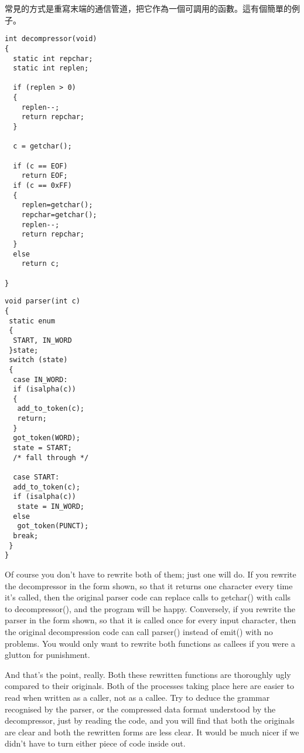 \documentclass[12pt]{article}
\begin{document}
\begin{CJK}{UTF8}{bsmi}
常見的方式是重寫末端的通信管道，把它作為一個可調用的函數。這有個簡單的例子。 

\newpage
\begin{multicols}{2}

\begin{lstlisting}[caption=decompression, basicstyle=\footnotesize]
int decompressor(void) 
{
  static int repchar;
  static int replen;

  if (replen > 0) 
  {
    replen--;
    return repchar;
  }

  c = getchar();

  if (c == EOF)
    return EOF;
  if (c == 0xFF) 
  {
    replen=getchar();
    repchar=getchar();
    replen--;
    return repchar;
  }
  else
    return c;

}
\end{lstlisting}

\begin{lstlisting}[caption=parsesr, basicstyle=\footnotesize, breaklines=true]
void parser(int c) 
{
 static enum 
 {
  START, IN_WORD
 }state;
 switch (state) 
 {
  case IN_WORD:
  if (isalpha(c)) 
  {
   add_to_token(c);
   return;
  }
  got_token(WORD);
  state = START;
  /* fall through */

  case START:
  add_to_token(c);
  if (isalpha(c))
   state = IN_WORD;
  else
   got_token(PUNCT);
  break;
 }
}
\end{lstlisting}
\end{multicols}

 Of course you don't have to rewrite both of them; just one will do. If you rewrite the decompressor in the form shown, so that it returns one character every time it's called, then the original parser code can replace calls to getchar() with calls to decompressor(), and the program will be happy. Conversely, if you rewrite the parser in the form shown, so that it is called once for every input character, then the original decompression code can call parser() instead of emit() with no problems. You would only want to rewrite both functions as callees if you were a glutton for punishment.

 And that's the point, really. Both these rewritten functions are thoroughly ugly compared to their originals. Both of the processes taking place here are easier to read when written as a caller, not as a callee. Try to deduce the grammar recognised by the parser, or the compressed data format understood by the decompressor, just by reading the code, and you will find that both the originals are clear and both the rewritten forms are less clear. It would be much nicer if we didn't have to turn either piece of code inside out.


\end{CJK}
\end{document}
